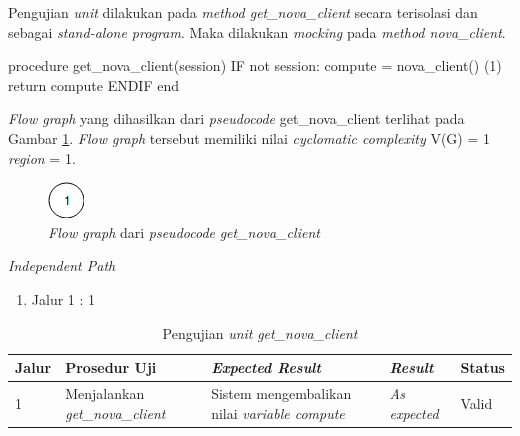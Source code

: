Pengujian \emph{unit} dilakukan pada \emph{method get\_nova\_client}
secara terisolasi dan sebagai \emph{stand-alone program}. Maka
dilakukan \emph{mocking} pada \emph{method nova\_client}.

\begin{code}
\begin{ignasicblock}[title=get\_nova\_client,minted language=text]
procedure get_nova_client(session)
    IF not session:
        compute = nova_client()   (1)
    return compute
    ENDIF
end
\end{ignasicblock}
\label{pc:get_nova_client}
\end{code}

\par\null\par
\noindent
\emph{Flow graph} yang dihasilkan dari \emph{pseudocode}
get\_nova\_client terlihat pada Gambar \ref{cfg:get_nova_client}.
\emph{Flow graph} tersebut memiliki nilai \emph{cyclomatic complexity} V(G) = 1 \emph{region} = 1.

\begin{figure}[H]
  \centering
  \includegraphics[width=.06\linewidth]{img/test-case/1node}
  \caption{\emph{Flow graph} dari \emph{pseudocode} \emph{get\_nova\_client}}
  \label{cfg:get_nova_client}
\end{figure}

\noindent
\emph{Independent Path}

\begin{enumerate}
\item Jalur 1 : 1
\end{enumerate}


\begin{longtable}{|P{.06\textwidth}|P{.30\textwidth}|P{.30\textwidth}|P{.10\textwidth}|P{.08\textwidth}|}
  \caption{Pengujian \emph{unit} \emph{get\_nova\_client}} \label{jalur:get_nova_client}\\
  \hline
  \textbf{Jalur} & \textbf{Prosedur Uji} & \textbf{\emph{Expected Result}}
  & \textbf{\emph{Result}} & \textbf{Status} \\\hline
  1 & Menjalankan \emph{get\_nova\_client} & Sistem mengembalikan nilai
                                             \emph{variable compute} & \emph{As expected} & Valid \\\hline
\end{longtable}

